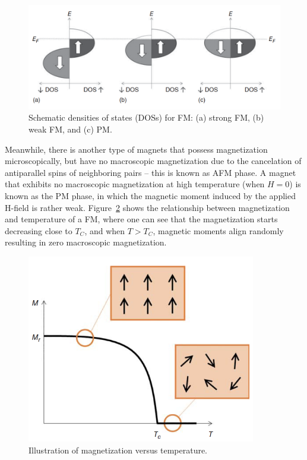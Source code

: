 \begin{figure}[H]
\centering
\captionsetup{justification=centering,margin=2cm}
	\includegraphics[width=130mm]{fig/review/dos.png}
	\caption[Schematic densities of states (DOSs) for ferromagnetism.]{Schematic densities of states (DOSs) for FM: (a) strong FM, (b) weak FM, and (c) PM.}
\label{fig:dos}
\end{figure}

Meanwhile, there is another type of magnets that possess magnetization
microscopically, but have no macroscopic magnetization due to the cancelation
of antiparallel spins of neighboring pairs – this is known as AFM phase.
A magnet that exhibits no macroscopic magnetization at high temperature (when $H = 0$) is known as the PM phase, in which the magnetic moment induced by the applied H-field is rather weak.
 Figure~\ref{fig:temp_mag} shows the relationship
between magnetization and temperature of a FM, where one can see
that the magnetization starts decreasing close to $T_C$, and when $T >T_C$, magnetic
moments align randomly resulting in zero macroscopic magnetization.
\begin{figure}[H]
	\centering
	\includegraphics[width=100mm]{fig/review/temp_mag.png}
	\caption[Illustration of magnetization versus temperature.]{Illustration of magnetization versus temperature.}
\label{fig:temp_mag}
\end{figure}

